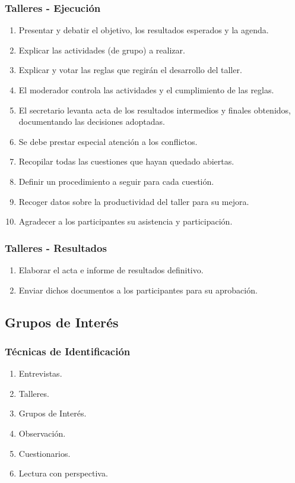 ﻿\documentclass[handout,a4paper,slidestop,xcolor=pst,dvips,blue]{beamer}
\begin{document}
\begin{frame}[t]
    \frametitle{Talleres - Ejecución}
    \begin{enumerate}[<+->]
        \item Presentar y debatir el objetivo, los resultados esperados y la agenda.
        \item Explicar las actividades (de grupo) a realizar.
        \item Explicar y votar las reglas que regirán el desarrollo del taller.
        \item El moderador controla las actividades y el cumplimiento de las reglas.
        \item El secretario levanta acta de los resultados intermedios y finales obtenidos, documentando las decisiones adoptadas.
        \item Se debe prestar especial atención a los conflictos.
        \item Recopilar todas las cuestiones que hayan quedado abiertas.
        \item Definir un procedimiento a seguir para cada cuestión.
        \item Recoger datos sobre la productividad del taller para su mejora.
        \item Agradecer a los participantes su asistencia y participación.
    \end{enumerate}
\end{frame}

\begin{frame}[t]
    \frametitle{Talleres - Resultados}
    \begin{enumerate}[<+->]
        \item Elaborar el acta e informe de resultados definitivo.
        \item Enviar dichos documentos a los participantes para su aprobación.
    \end{enumerate}
\end{frame}

\subsection{Grupos de Interés}

\begin{frame}[c]
    \frametitle{Técnicas de Identificación}
    \begin{enumerate}
         \item Entrevistas.
         \item Talleres.
         \item \alert{Grupos de Interés}.
         \item Observación.
         \item Cuestionarios.
         \item Lectura con perspectiva.
    \end{enumerate}
\end{frame}
\end{document}
